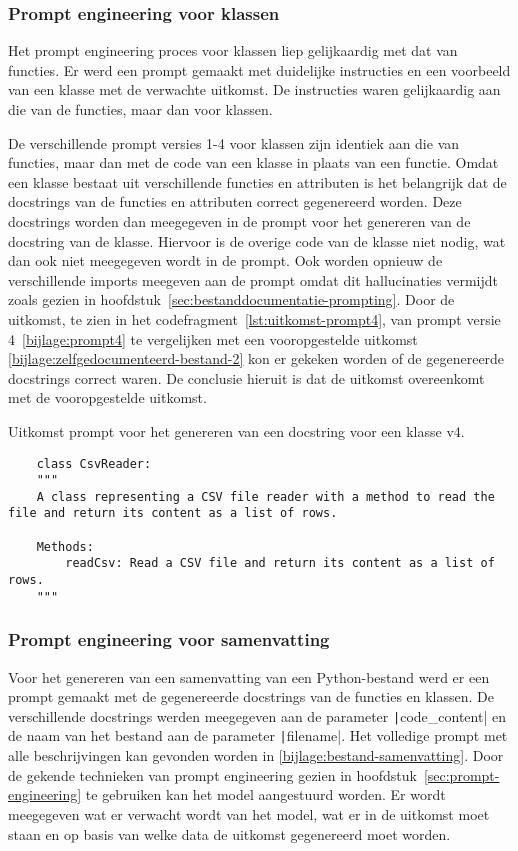 \subsubsection{Prompt engineering voor klassen}
Het prompt engineering proces voor klassen liep gelijkaardig met dat van functies.
Er werd een prompt gemaakt met duidelijke instructies en een voorbeeld van een klasse met de verwachte uitkomst.
De instructies waren gelijkaardig aan die van de functies, maar dan voor klassen.

De verschillende prompt versies 1-4 voor klassen zijn identiek aan die van functies, maar dan met de code van een klasse in plaats van een functie.
Omdat een klasse bestaat uit verschillende functies en attributen is het belangrijk dat de docstrings van de functies en attributen correct gegenereerd worden.
Deze docstrings worden dan meegegeven in de prompt voor het genereren van de docstring van de klasse.
Hiervoor is de overige code van de klasse niet nodig, wat dan ook niet meegegeven wordt in de prompt.
Ook worden opnieuw de verschillende imports meegeven aan de prompt omdat dit hallucinaties vermijdt zoals gezien in hoofdstuk~\ref{sec:bestanddocumentatie-prompting}.
Door de uitkomst, te zien in het codefragment~\ref{lst:uitkomst-prompt4}, van prompt versie 4~\ref{bijlage:prompt4} te vergelijken met een vooropgestelde uitkomst \ref{bijlage:zelfgedocumenteerd-bestand-2} kon er gekeken worden of de gegenereerde docstrings correct waren.
De conclusie hieruit is dat de uitkomst overeenkomt met de vooropgestelde uitkomst. 

\begin{listing}
    \caption{Uitkomst prompt voor het genereren van een docstring voor een klasse v4.}
    \label{lst:uitkomst-prompt4}
    \begin{verbatim}
    class CsvReader:
    """
    A class representing a CSV file reader with a method to read the file and return its content as a list of rows.

    Methods:
        readCsv: Read a CSV file and return its content as a list of rows.
    """
    \end{verbatim}
\end{listing}

\subsubsection{Prompt engineering voor samenvatting}
Voor het genereren van een samenvatting van een Python-bestand werd er een prompt gemaakt met de gegenereerde docstrings van de functies en klassen.
De verschillende docstrings werden meegegeven aan de parameter \texttt|code_content| en de naam van het bestand aan de parameter 
\texttt|filename|.
Het volledige prompt met alle beschrijvingen kan gevonden worden in \ref{bijlage:bestand-samenvatting}.
Door de gekende technieken van prompt engineering gezien in hoofdstuk~\ref{sec:prompt-engineering} te gebruiken kan het model aangestuurd worden.
Er wordt meegegeven wat er verwacht wordt van het model, wat er in de uitkomst moet staan en op basis van welke data de uitkomst gegenereerd moet worden.

